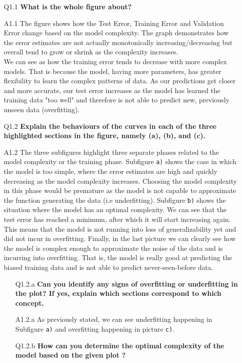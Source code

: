 \documentclass[tikz,14pt,fleqn]{article}
\begin{document}
\begin{itemize}
\item[Q1.1] \textbf{What is the whole figure about?}
\item[A1.1] The figure shows how the Test Error, Training Error and Validation Error change based on the model complexity. The graph demonstrates how the error estimates are not actually monotonically increasing/decreasing but overall tend to grow or shrink as the complexity increases.\\
We can see as how the training error tends to decrease with more complex models. That is because the model, having more parameters, has greater flexibility to learn the complex patterns of data. As our predictions get closer and more accurate, our test error increases as the model has learned the training data "too well" and therefore is not able to predict new, previously unseen data (overfitting).
\item[Q1.2] \textbf{Explain the behaviours of the curves in each of the three highlighted sections in the figure, namely (a), (b), and (c).}   
\item[A1.2] The three subfigures highlight three separate phases related to the model complexity or the training phase. Subfigure \verb|a)| shows the case in which the model is too simple, where the error estimates are high and quickly decreasing as the model complexity increases. Choosing the model complexity in this phase would be premature as the model is not capable to approximate the function generating the data (i.e underfitting). Subfigure \verb|b)| shows the situation where the model has an optimal complexity. We can see that the test error has reached a minimum, after which it will start increasing again. This means that the model is not running into loss of generalizability yet and did not incur in overfitting. Finally, in the last picture we can clearly see how the model is complex enough to approximate the noise of the data and is incurring into overfitting. That is, the model is really good at predicting the biased training data and is not able to predict never-seen-before data.
\begin{itemize}
\item[Q1.2.a] \textbf{Can you identify any signs of overfitting or underfitting in the plot? If yes, explain which sections correspond to which concept.}
\item[A1.2.a] As previously stated, we can see underfitting happening in Subfigure \verb|a)| and overfitting happening in picture \verb|c)|.
\item[Q1.2.b] \textbf{How can you determine the optimal complexity of the model based on the given plot ?}

\end{itemize}
\end{itemize}
\end{document}
